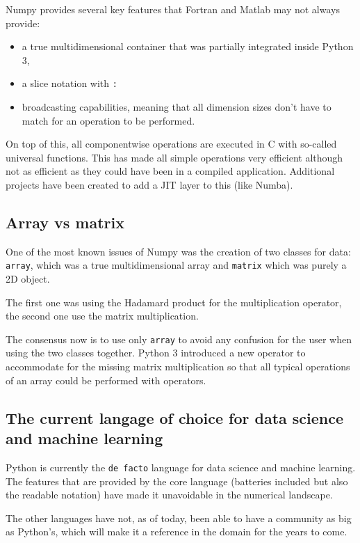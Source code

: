 Numpy provides several key features that Fortran and Matlab may
 not always provide:

\begin{itemize}
  \item a true multidimensional container that was partially integrated
   inside Python 3,
  \item a slice notation with \texttt{:}
  \item broadcasting capabilities, meaning that all dimension sizes
  don't have to match for an operation to be performed.
\end{itemize}

On top of this, all componentwise operations are executed in C with so-called
 universal functions. This has made all simple operations very efficient
 although not as efficient as they could have been in a compiled application.
 Additional projects have been created to add a JIT layer to this (like Numba).

\subsection{Array vs matrix}
\label{S:Python:arraymatrix}

One of the most known issues of Numpy was the creation of two
classes for data: \texttt{array}, which was a true multidimensional
array and \texttt{matrix} which was purely a 2D object.

The first one was using the Hadamard product for the multiplication
 operator, the second one use the matrix multiplication.

The consensus now is to use only \texttt{array} to avoid any confusion
  for the user when using the two classes together. Python 3 introduced
  a new operator to accommodate for the missing matrix multiplication
  so that all typical operations of an array could be performed with
  operators.

\subsection{The current langage of choice for data science and machine learning}
\label{S:Python:currentlanguage}

Python is currently the \texttt{de facto} language for data science and
 machine learning. The features that are provided by the core language
 (batteries included but also the readable notation) have made it
 unavoidable in the numerical landscape.

 The other languages have not, as of today, been able to have
  a community as big as Python's, which will make it a reference in the
  domain for the years to come.

